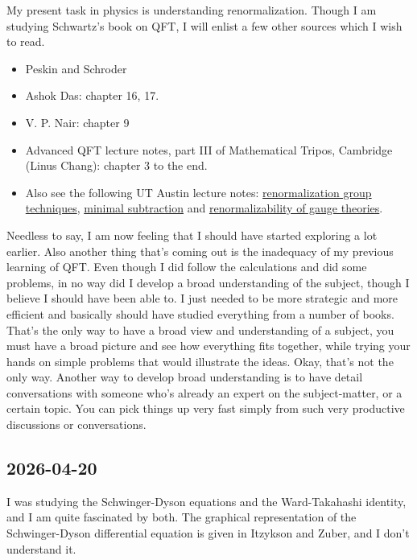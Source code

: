 \documentclass[11pt,a4paper]{article}
\begin{document}
\sloppy My present task in physics is understanding renormalization. Though I am studying Schwartz's book on QFT, I will enlist a few other sources which I wish to read. 

\begin{itemize}
	\item Peskin and Schroder 
	\item Ashok Das: chapter 16, 17. 
	\item V. P. Nair: chapter 9 
	\item Advanced QFT lecture notes, part III of Mathematical Tripos, Cambridge (Linus Chang): chapter 3 to the end. 
	\item Also see the following UT Austin lecture notes: \href{https://web2.ph.utexas.edu/~vadim/Classes/2024f-qft/RG.pdf}{renormalization group techniques},  \href{https://web2.ph.utexas.edu/~vadim/Classes/2024f-qft/ms.pdf}{minimal subtraction} and \href{https://web2.ph.utexas.edu/~vadim/Classes/2024f-qft/RGT.pdf}{renormalizability of gauge theories}. 
\end{itemize}

Needless to say, I am now feeling that I should have started exploring a lot earlier. Also another thing that's coming out is the inadequacy of my previous learning of QFT. Even though I did follow the calculations and did some problems, in no way did I develop a broad understanding of the subject, though I believe I should have been able to. I just needed to be more strategic and more efficient and basically should have studied everything from a number of books. That's the only way to have a broad view and understanding of a subject, you must have a broad picture and see how everything fits together, while trying your hands on simple problems that would illustrate the ideas. Okay, that's not the only way. Another way to develop broad understanding is to have detail conversations with someone who's already an expert on the subject-matter, or a certain topic. You can pick things up very fast simply from such very productive discussions or conversations. 





\subsection{2026-04-20}
I was studying the Schwinger-Dyson equations and the Ward-Takahashi identity, and I am quite fascinated by both. The graphical representation of the Schwinger-Dyson differential equation is given in Itzykson and Zuber, and I don't understand it. 
\end{document}
